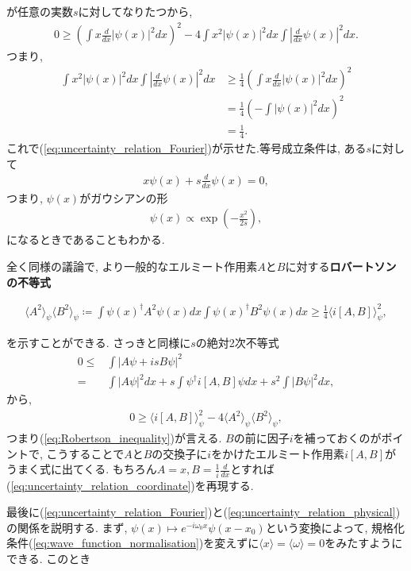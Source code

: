 \documentclass{ltjsarticle}
\theoremstyle{definition}
\newcommand{\parno}{\par\noindent}
\begin{document}
が任意の実数$s$に対してなりたつから,
\begin{align}
  0\ge\left(\int x\frac d{dx}|\psi(x)|^2dx\right)^2-4\int x^2|\psi(x)|^2dx\int\left|\frac d{dx}\psi(x)\right|^2dx.
\end{align}
つまり,
\begin{align}
  \int x^2|\psi(x)|^2dx\int\left|\frac d{dx}\psi(x)\right|^2dx&\ge\frac14\left(\int x\frac d{dx}|\psi(x)|^2dx\right)^2\\
  &=\frac14\left(-\int|\psi(x)|^2dx\right)^2\\
  &=\frac14.\label{eq:uncertainty_relation_coordinate}
\end{align}
これで(\ref{eq:uncertainty_relation_Fourier})が示せた.等号成立条件は, ある$s$に対して
\begin{align}
  x\psi(x)+s\frac d{dx}\psi(x)=0,
\end{align}
つまり, $\psi(x)$がガウシアンの形
\begin{align}
  \psi(x)\propto\exp\left(-\frac{x^2}{2s}\right),
\end{align}
になるときであることもわかる.\par
全く同様の議論で, より一般的なエルミート作用素$A$と$B$に対する\textbf{ロバートソンの不等式}
\begin{tcolorbox}
\begin{align}
  \langle A^2\rangle_\psi\langle B^2\rangle_\psi\coloneqq\int\psi(x)^\dagger A^2\psi(x)dx\int\psi(x)^\dagger B^2\psi(x)dx\ge\frac14\langle i[A,B]\rangle_\psi^2,\label{eq:Robertson_inequality}
\end{align}
\end{tcolorbox}
\parno
を示すことができる. さっきと同様に$s$の絶対2次不等式
\begin{align}
  0\le&\int\left|A\psi+isB\psi\right|^2\\
  =&\int\left|A\psi\right|^2dx+s\int\psi^\dagger i\left[A,B\right]\psi dx+s^2\int\left|B\psi\right|^2dx,
\end{align}
から,
\begin{align}
  0\ge\langle i[A,B]\rangle_\psi^2-4\langle A^2\rangle_\psi\langle B^2\rangle_\psi,
\end{align}
つまり(\ref{eq:Robertson_inequality})が言える. $B$の前に因子$i$を補っておくのがポイントで, こうすることで$A$と$B$の交換子に$i$をかけたエルミート作用素$i[A,B]$がうまく式に出てくる. もちろん$A=x, B=\displaystyle\frac1i\frac d{dx}$とすれば(\ref{eq:uncertainty_relation_coordinate})を再現する.
\par
最後に(\ref{eq:uncertainty_relation_Fourier})と(\ref{eq:uncertainty_relation_physical})の関係を説明する. まず, $\psi(x)\mapsto e^{-i\omega_0x}\psi(x-x_0)$という変換によって, 規格化条件(\ref{eq:wave_function_normalisation})を変えずに$\langle x\rangle=\langle\omega\rangle=0$をみたすようにできる. このとき
\end{document}
